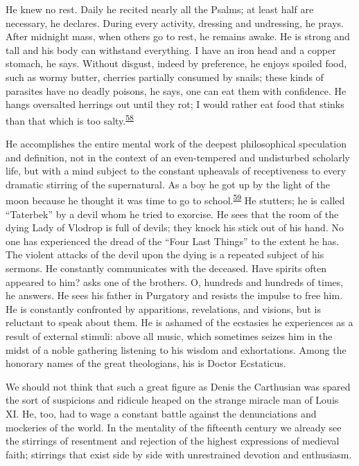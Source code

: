 He knew no rest. Daily he recited nearly all the Psalms; at least
\protect\hypertarget{14_Chapter_Seven__THE_PIOUS_PERSONA.xhtmlux5cux23page_219}{}{}half
are necessary, he declares. During every activity, dressing and
undressing, he prays. After midnight mass, when others go to rest, he
remains awake. He is strong and tall and his body can withstand
everything. I have an iron head and a copper stomach, he says. Without
disgust, indeed by preference, he enjoys spoiled food, such as wormy
butter, cherries partially consumed by snails; these kinds of parasites
have no deadly poisons, he says, one can eat them with confidence. He
hangs oversalted herrings out until they rot; I would rather eat food
that stinks than that which is too
salty.\textsuperscript{\protect\hypertarget{14_Chapter_Seven__THE_PIOUS_PERSONA.xhtmlux5cux23id_909}{\protect\hyperlink{23_NOTES.xhtmlux5cux23id_910}{58}}}

He accomplishes the entire mental work of the deepest philosophical
speculation and definition, not in the context of an even-tempered and
undisturbed scholarly life, but with a mind subject to the constant
upheavals of receptiveness to every dramatic stirring of the
supernatural. As a boy he got up by the light of the moon because he
thought it was time to go to
school.\textsuperscript{\protect\hypertarget{14_Chapter_Seven__THE_PIOUS_PERSONA.xhtmlux5cux23id_907}{\protect\hyperlink{23_NOTES.xhtmlux5cux23id_908}{59}}}
He stutters; he is called ``Taterbek'' by a devil whom he tried to
exorcise. He sees that the room of the dying Lady of Vlodrop is full of
devils; they knock his stick out of his hand. No one has experienced the
dread of the ``Four Last Things'' to the extent he has. The violent
attacks of the devil upon the dying is a repeated subject of his
sermons. He constantly communicates with the deceased. Have spirits
often appeared to him? asks one of the brothers. O, hundreds and
hundreds of times, he answers. He sees his father in Purgatory and
resists the impulse to free him. He is constantly confronted by
apparitions, revelations, and visions, but is reluctant to speak about
them. He is ashamed of the ecstasies he experiences as a result of
external stimuli: above all music, which sometimes seizes him in the
midst of a noble gathering listening to his wisdom and exhortations.
Among the honorary names of the great theologians, his is Doctor
Ecstaticus.

We should not think that such a great figure as Denis the Carthusian was
spared the sort of suspicions and ridicule heaped on the strange miracle
man of Louis XI. He, too, had to wage a constant battle against the
denunciations and mockeries of the world. In the mentality of the
fifteenth century we already see the stirrings of resentment and
rejection of the highest expressions of medieval faith; stirrings that
exist side by side with unrestrained devotion and enthusiasm.
